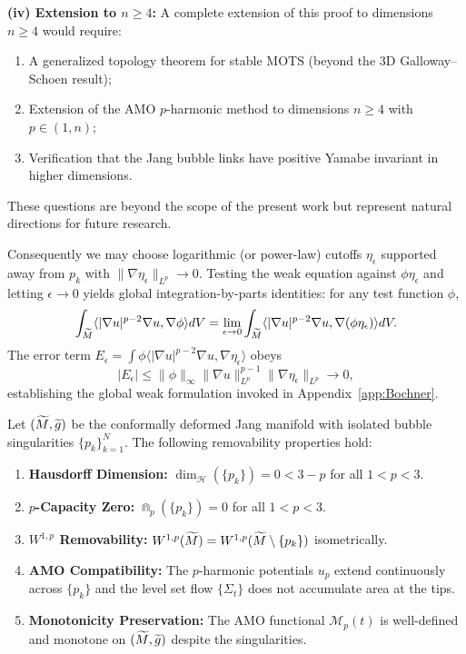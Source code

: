 \begin{remark}[Logarithmic Divergence at $p = 3$ and Higher Dimensions]
\textbf{(iv) Extension to $n \ge 4$:} A complete extension of this proof to dimensions $n \ge 4$ would require:
\begin{enumerate}
    \item A generalized topology theorem for stable MOTS (beyond the 3D Galloway--Schoen result);
    \item Extension of the AMO $p$-harmonic method to dimensions $n \ge 4$ with $p \in (1, n)$;
    \item Verification that the Jang bubble links have positive Yamabe invariant in higher dimensions.
\end{enumerate}
These questions are beyond the scope of the present work but represent natural directions for future research.
\end{remark}

Consequently we may choose logarithmic (or power-law) cutoffs $\eta_\epsilon$ supported away from $p_k$ with $\|\nabla \eta_\epsilon\|_{L^p} \to 0$. Testing the weak equation against $\phi \eta_\epsilon$ and letting $\epsilon \to 0$ yields global integration-by-parts identities: for any test function $\phi$,
\[
\int_{\widetilde{M}} \langle |\nabla u|^{p-2} \nabla u, \nabla \phi \rangle dV = \lim_{\epsilon\to 0} \int_{\widetilde{M}} \langle |\nabla u|^{p-2} \nabla u, \nabla (\phi \eta_\epsilon) \rangle dV.
\]
The error term $E_\epsilon = \int \phi \langle |\nabla u|^{p-2} \nabla u, \nabla \eta_\epsilon \rangle$ obeys
\[
|E_\epsilon| \le \|\phi\|_\infty \|\nabla u\|_{L^p}^{p-1} \|\nabla \eta_\epsilon\|_{L^p} \longrightarrow 0,
\]
establishing the global weak formulation invoked in Appendix~\ref{app:Bochner}.

\begin{theorem}\label{thm:JangBubbleRemovability}
Let $(\widetilde{M}, \widetilde{g})$ be the conformally deformed Jang manifold with isolated bubble singularities $\{p_k\}_{k=1}^N$. The following removability properties hold:
\begin{enumerate}
    \item \textbf{Hausdorff Dimension:} $\dim_{\mathcal{H}}(\{p_k\}) = 0 < 3 - p$ for all $1 < p < 3$.
    \item \textbf{$p$-Capacity Zero:} $\Cap_p(\{p_k\}) = 0$ for all $1 < p < 3$.
    \item \textbf{$W^{1,p}$ Removability:} $W^{1,p}(\widetilde{M}) = W^{1,p}(\widetilde{M} \setminus \{p_k\})$ isometrically.
    \item \textbf{AMO Compatibility:} The $p$-harmonic potentials $u_p$ extend continuously across $\{p_k\}$ and the level set flow $\{\Sigma_t\}$ does not accumulate area at the tips.
    \item \textbf{Monotonicity Preservation:} The AMO functional $\mathcal{M}_p(t)$ is well-defined and monotone on $(\widetilde{M}, \widetilde{g})$ despite the singularities.
\end{enumerate}
\end{theorem}

